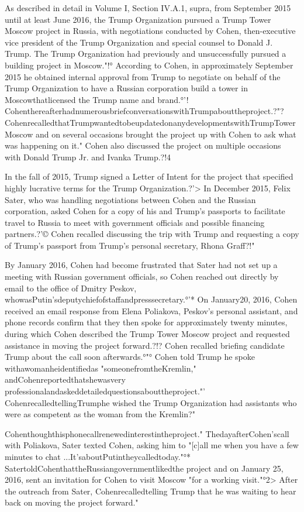 As described in detail in Volume I, Section IV.A.1, supra, from September 2015 until at least June 2016, the Trump Organization pursued a Trump Tower Moscow project in Russia, with negotiations conducted by Cohen, then-executive vice president of the Trump Organization and special counsel to Donald J. Trump.%
The Trump Organization had previously and unsuccessfully pursued a building project in Moscow."!°
According to Cohen, in approximately September 2015 he obtained internal approval from Trump to negotiate on behalf of the Trump Organization to have a Russian corporation build a tower in Moscowthatlicensed the Trump name and brand.°'!
CohenthereafterhadnumerousbriefconversationswithTrumpabouttheproject.?"?
CohenrecalledthatTrumpwantedtobeupdatedonanydevelopmentswithTrumpTowerMoscow and on several occasions brought the project up with Cohen to ask what was happening on it." Cohen also discussed the project on multiple occasions with Donald Trump Jr. and Ivanka Trump.?!4

In the fall of 2015, Trump signed a Letter of Intent for the project that specified highly lucrative terms for the Trump Organization.?'>
In December 2015, Felix Sater, who was handling negotiations between Cohen and the Russian corporation, asked Cohen for a copy of his and Trump's passports to facilitate travel to Russia to meet with government officials and possible financing partners.?'©
Cohen recalled discussing the trip with Trump and requesting a copy of Trump's passport from Trump's personal secretary, Rhona Graff?!"

By January 2016, Cohen had become frustrated that Sater had not set up a meeting with Russian government officials, so Cohen reached out directly by email to the office of Dmitry Peskov, whowasPutin'sdeputychiefofstaffandpresssecretary.°'*
On January20, 2016, Cohen received an email response from Elena Poliakova, Peskov's personal assistant, and phone records confirm that they then spoke for approximately twenty minutes, during which Cohen described the Trump Tower Moscow project and requested assistance in moving the project forward.?!?
Cohen recalled briefing candidate Trump about the call soon afterwards.°"°
Cohen told Trump he spoke withawomanheidentifiedas "someonefromtheKremlin," andCohenreportedthatshewasvery professionalandaskeddetailedquestionsabouttheproject."'
CohenrecalledtellingTrumphe wished the Trump Organization had assistants who were as competent as the woman from the Kremlin?"

Cohenthoughthisphonecallrenewedinterestintheproject."
ThedayafterCohen'scall with Poliakova, Sater texted Cohen, asking him to "[c]all me when you have a few minutes to chat ...It'saboutPutintheycalledtoday."°*
SatertoldCohenthattheRussiangovernmentlikedthe project and on January 25, 2016, sent an invitation for Cohen to visit Moscow "for a working visit."°2>
After the outreach from Sater, Cohenrecalledtelling Trump that he was waiting to hear back on moving the project forward."

